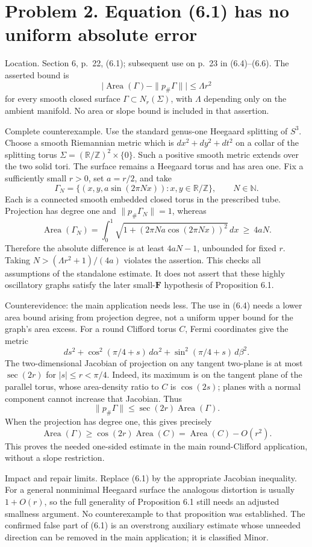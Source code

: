 \documentclass[10pt]{article}
\begin{document}
\section*{Problem 2. Equation (6.1) has no uniform absolute error}
Location. Section 6, p. 22, (6.1); subsequent use on p. 23 in (6.4)–(6.6). The asserted bound is \[\bigl|\operatorname{Area}(\Gamma)-\|p_\#\Gamma\|\bigr|\le \Lambda r^2\] for every smooth closed surface \(\Gamma\subset N_r(\Sigma)\), with \(\Lambda\) depending only on the ambient manifold. No area or slope bound is included in that assertion.\par
Complete counterexample. Use the standard genus-one Heegaard splitting of \(S^3\). Choose a smooth Riemannian metric which is \(dx^2+dy^2+dt^2\) on a collar of the splitting torus \(\Sigma=(\mathbb R/\mathbb Z)^2\times\{0\}\). Such a positive smooth metric extends over the two solid tori. The surface remains a Heegaard torus and has area one. Fix a sufficiently small \(r>0\), set \(a=r/2\), and take \[\Gamma_N=\{(x,y,a\sin(2\pi Nx)):x,y\in\mathbb R/\mathbb Z\},
 \qquad N\in\mathbb N.\] Each is a connected smooth embedded closed torus in the prescribed tube. Projection has degree one and \(\|p_\#\Gamma_N\|=1\), whereas \[\operatorname{Area}(\Gamma_N)=
 \int_0^1\sqrt{1+(2\pi Na\cos(2\pi Nx))^2}\,dx
 \ \ge\ 4aN.\] Therefore the absolute difference is at least \(4aN-1\), unbounded for fixed \(r\). Taking \(N>(\Lambda r^2+1)/(4a)\) violates the assertion. This checks all assumptions of the standalone estimate. It does not assert that these highly oscillatory graphs satisfy the later small-\(\mathbf F\) hypothesis of Proposition 6.1.\par
Counterevidence: the main application needs less. The use in (6.4) needs a lower area bound arising from projection degree, not a uniform upper bound for the graph’s area excess. For a round Clifford torus \(C\), Fermi coordinates give the metric \[ds^2+\cos^2(\pi/4+s)\,d\alpha^2+
       \sin^2(\pi/4+s)\,d\beta^2.\] The two-dimensional Jacobian of projection on any tangent two-plane is at most \(\sec(2r)\) for \(|s|\le r<\pi/4\). Indeed, its maximum is on the tangent plane of the parallel torus, whose area-density ratio to \(C\) is \(\cos(2s)\); planes with a normal component cannot increase that Jacobian. Thus \[\|p_\#\Gamma\|\le\sec(2r)\operatorname{Area}(\Gamma).\] When the projection has degree one, this gives precisely \[\operatorname{Area}(\Gamma)\ge\cos(2r)\operatorname{Area}(C)
 =\operatorname{Area}(C)-O(r^2).\] This proves the needed one-sided estimate in the main round-Clifford application, without a slope restriction.\par
Impact and repair limits. Replace (6.1) by the appropriate Jacobian inequality. For a general nonminimal Heegaard surface the analogous distortion is usually \(1+O(r)\), so the full generality of Proposition 6.1 still needs an adjusted smallness argument. No counterexample to that proposition was established. The confirmed false part of (6.1) is an overstrong auxiliary estimate whose unneeded direction can be removed in the main application; it is classified Minor.\par
\end{document}
